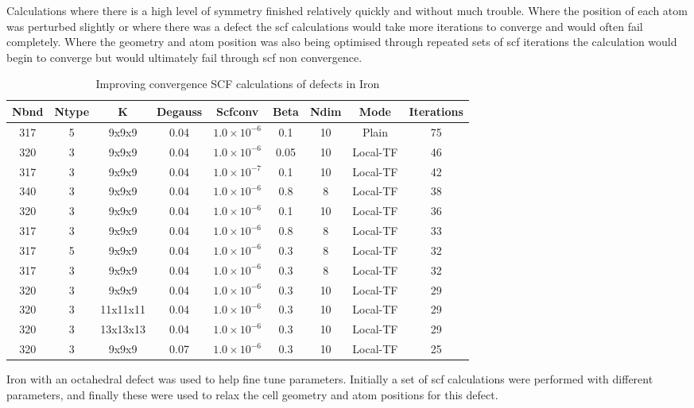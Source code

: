 Calculations where there is a high level of symmetry finished relatively quickly and without much trouble.  Where the position of each atom was perturbed slightly or where there was a defect the \acrshort{scf} calculations would take more iterations to converge and would often fail completely.  Where the geometry and atom position was also being optimised through repeated sets of \acrshort{scf} iterations the calculation would begin to converge but would ultimately fail through \acrshort{scf} non convergence.

\begin{table}[h]
\begin{center}
\begin{tabular}{c c c c c c c c c}
\hline\hline
Nbnd & Ntype & K & Degauss & Scfconv & Beta & Ndim & Mode & Iterations \\
\hline\hline
317 & 5 & 9x9x9 & 0.04 & $1.0 \times 10^{-6}$ & 0.1 & 10 & Plain & 75 \\
320 & 3 & 9x9x9 & 0.04 & $1.0 \times 10^{-6}$ & 0.05 & 10 & Local-TF & 46 \\
317 & 3 & 9x9x9 & 0.04 & $1.0 \times 10^{-7}$ & 0.1 & 10 & Local-TF & 42 \\
340 & 3 & 9x9x9 & 0.04 & $1.0 \times 10^{-6}$ & 0.8 & 8 & Local-TF & 38 \\
320 & 3 & 9x9x9 & 0.04 & $1.0 \times 10^{-6}$ & 0.1 & 10 & Local-TF & 36 \\
317 & 3 & 9x9x9 & 0.04 & $1.0 \times 10^{-6}$ & 0.8 & 8 & Local-TF & 33 \\
317 & 5 & 9x9x9 & 0.04 & $1.0 \times 10^{-6}$ & 0.3 & 8 & Local-TF & 32 \\
317 & 3 & 9x9x9 & 0.04 & $1.0 \times 10^{-6}$ & 0.3 & 8 & Local-TF & 32 \\
320 & 3 & 9x9x9 & 0.04 & $1.0 \times 10^{-6}$ & 0.3 & 10 & Local-TF & 29 \\
320 & 3 & 11x11x11 & 0.04 & $1.0 \times 10^{-6}$ & 0.3 & 10 & Local-TF & 29 \\
320 & 3 & 13x13x13 & 0.04 & $1.0 \times 10^{-6}$ & 0.3 & 10 & Local-TF & 29 \\
320 & 3 & 9x9x9 & 0.07 & $1.0 \times 10^{-6}$ & 0.3 & 10 & Local-TF & 25 \\
\hline\hline
\end{tabular}
\end{center}
\caption{Improving convergence SCF calculations of defects in Iron}
\label{table:trialparametersocta}
\end{table}

Iron with an octahedral defect was used to help fine tune parameters.  Initially a set of \acrshort{scf} calculations were performed with different parameters, and finally these were used to relax the cell geometry and atom positions for this defect.


